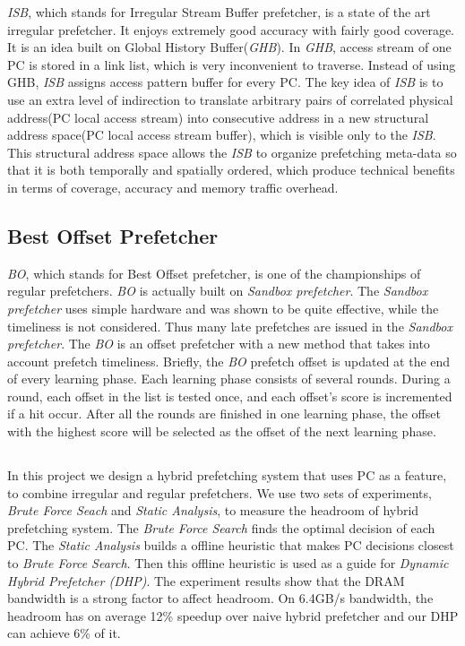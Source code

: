   \emph{ISB}, which stands for Irregular Stream Buffer prefetcher, is a state of the art irregular prefetcher. It enjoys extremely good accuracy with fairly good coverage. It is an idea built on Global History Buffer(\emph{GHB})\cite{ghbpaper}.
In \emph{GHB}, access stream of one PC is stored in a link list, which is very inconvenient to traverse. Instead of using GHB, \emph{ISB} assigns access pattern buffer for every PC.
The key idea of \emph{ISB} is to use an extra level of indirection to translate arbitrary pairs of correlated physical address(PC local access stream) into consecutive address in a new structural address space(PC local access stream buffer), which is visible only to the \emph{ISB}.
This structural address space allows the \emph{ISB} to organize prefetching meta-data so that it is both temporally and spatially ordered, which produce technical benefits in terms of coverage, accuracy and memory traffic overhead.

  \subsection{Best Offset Prefetcher}
  \label{sec:bointro}

  \emph{BO}, which stands for Best Offset prefetcher, is one of the championships of regular prefetchers. \emph{BO} is actually built on \emph{Sandbox prefetcher}\cite{sandboxpaper}.
 The \emph{Sandbox prefetcher} uses simple hardware and was shown to be quite effective, while the timeliness is not considered.
 Thus many late prefetches are issued in the \emph{Sandbox prefetcher}.
 The \emph{BO} is an offset prefetcher with a new method that takes into account prefetch timeliness. Briefly, the \emph{BO} prefetch offset is updated at the end of every learning phase. Each learning phase consists of several rounds.
 During a round, each offset in the list is tested once, and each offset's score is incremented if a hit occur.
 After all the rounds are finished in one learning phase, the offset with the highest score will be selected as the offset of the next learning phase.


 \subsection*{}
 In this project we design a hybrid prefetching system that uses PC as a feature, to combine irregular and regular prefetchers.
We use two sets of experiments, \emph{Brute Force Seach} and \emph{Static Analysis}, to measure the headroom of hybrid prefetching system. The \emph{Brute Force Search} finds the optimal decision of each PC.  
The \emph{Static Analysis} builds a offline heuristic that makes PC decisions closest to \emph{Brute Force Search}. 
Then this offline heuristic is used as a guide for \emph{Dynamic Hybrid Prefetcher (DHP)}.
The experiment results show that the DRAM bandwidth is a strong factor to affect headroom. On 6.4GB/s bandwidth, the headroom has on average 12\% speedup over naive hybrid prefetcher and our DHP can achieve 6\% of it. \par

